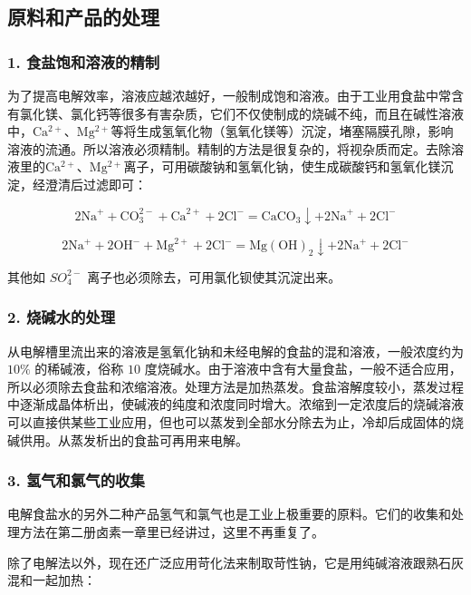 \subsection{原料和产品的处理}

\subsubsection{1. 食盐饱和溶液的精制}

为了提高电解效率，溶液应越浓越好，一般制成饱和溶液。由于工业用食盐中常含有氯化镁、氯化钙等很多有害杂质，它们不仅使制成的烧碱不纯，而且在碱性溶液中，\(\mathrm{Ca^{2+}}\)、\(\mathrm{Mg^{2+}}\)等将生成氢氧化物（氢氧化镁等）沉淀，堵塞隔膜孔隙，影响溶液的流通。所以溶液必须精制。精制的方法是很复杂的，将视杂质而定。去除溶液里的\(\mathrm{Ca^{2+}}\)、\(\mathrm{Mg^{2+}}\)离子，可用碳酸钠和氢氧化钠，使生成碳酸钙和氢氧化镁沉淀，经澄清后过滤即可：

\[
2 \mathrm{Na} ^ {+} + \mathrm{CO} _ {3}^{2-} + \mathrm{Ca} ^{2+} + 2 \mathrm{Cl} ^ {-} = \mathrm{CaCO} _ {3} \downarrow + 2 \mathrm{Na} ^ {+} + 2 \mathrm{Cl} ^ {-}
\]

\[
2 \mathrm{Na} ^ {+} + 2 \mathrm{OH} ^ {-} + \mathrm{Mg} ^{2+} + 2 \mathrm{Cl} ^ {-} = \mathrm{Mg} (\mathrm{OH}) _ {2} \downarrow + 2 \mathrm{Na} ^ {+} + 2 \mathrm{Cl} ^ {-}
\]

其他如 \(SO_{4}^{2-}\) 离子也必须除去，可用氯化钡使其沉淀出来。

\subsubsection{2. 烧碱水的处理}

从电解槽里流出来的溶液是氢氧化钠和未经电解的食盐的混和溶液，一般浓度约为
\(10\%\) 的稀碱液，俗称 \(10\)
度烧碱水。由于溶液中含有大量食盐，一般不适合应用，所以必须除去食盐和浓缩溶液。处理方法是加热蒸发。食盐溶解度较小，蒸发过程中逐渐成晶体析出，使碱液的纯度和浓度同时增大。浓缩到一定浓度后的烧碱溶液可以直接供某些工业应用，但也可以蒸发到全部水分除去为止，冷却后成固体的烧碱供用。从蒸发析出的食盐可再用来电解。

\subsubsection{3. 氢气和氯气的收集}

电解食盐水的另外二种产品氢气和氯气也是工业上极重要的原料。它们的收集和处理方法在第二册卤素一章里已经讲过，这里不再重复了。

除了电解法以外，现在还广泛应用苛化法来制取苛性钠，它是用纯碱溶液跟熟石灰混和一起加热：

